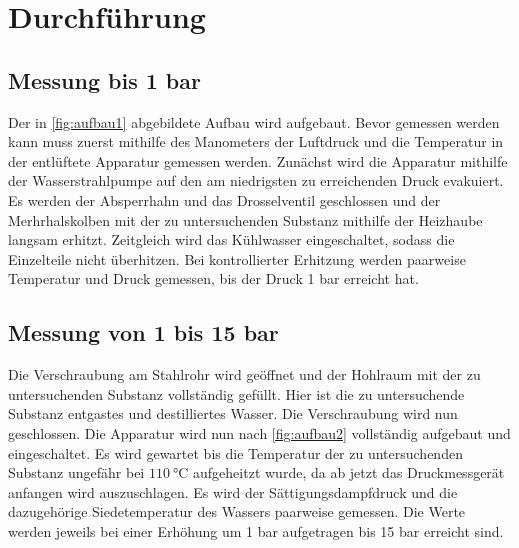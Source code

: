 \section{Durchführung}
\label{sec:Durchführung}

\subsection{Messung bis 1 bar}
Der in \autoref{fig:aufbau1} abgebildete Aufbau wird aufgebaut. Bevor gemessen werden kann muss zuerst mithilfe des Manometers
der Luftdruck und die Temperatur in der entlüftete Apparatur gemessen werden. Zunächst wird die Apparatur mithilfe der 
Wasserstrahlpumpe auf den am niedrigsten zu erreichenden Druck evakuiert. Es werden der Absperrhahn und das Drosselventil geschlossen
und der Merhrhalskolben mit der zu untersuchenden Substanz mithilfe der Heizhaube langsam erhitzt.
Zeitgleich wird das Kühlwasser eingeschaltet, sodass die Einzelteile nicht überhitzen. Bei kontrollierter Erhitzung werden paarweise
Temperatur und Druck gemessen, bis der Druck 1 bar erreicht hat.

\subsection{Messung von 1 bis 15 bar}
Die Verschraubung am Stahlrohr wird geöffnet und der Hohlraum mit der zu untersuchenden Substanz vollständig gefüllt.
Hier ist die zu untersuchende Substanz entgastes und destilliertes Wasser. Die Verschraubung wird nun geschlossen.
Die Apparatur wird nun nach \autoref{fig:aufbau2} vollständig aufgebaut und eingeschaltet. Es wird gewartet bis die Temperatur der zu 
untersuchenden Substanz ungefähr bei $\SI{110}{\celsius}$ aufgeheitzt wurde, da ab jetzt das Druckmessgerät anfangen wird auszuschlagen. 
Es wird der Sättigungsdampfdruck und die dazugehörige Siedetemperatur des Wassers paarweise gemessen.
Die Werte werden jeweils bei einer Erhöhung um 1 bar aufgetragen bis 15 bar erreicht sind.


